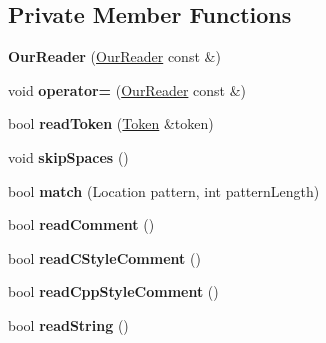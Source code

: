 \subsection*{Private Member Functions}
\begin{DoxyCompactItemize}
\item 
\hypertarget{class_json_1_1_our_reader_aee013005522c0d34d2e14962851487ac}{}{\bfseries Our\+Reader} (\hyperlink{class_json_1_1_our_reader}{Our\+Reader} const \&)\label{class_json_1_1_our_reader_aee013005522c0d34d2e14962851487ac}

\item 
\hypertarget{class_json_1_1_our_reader_ad418de7c47bd3d0510888e22110b796e}{}void {\bfseries operator=} (\hyperlink{class_json_1_1_our_reader}{Our\+Reader} const \&)\label{class_json_1_1_our_reader_ad418de7c47bd3d0510888e22110b796e}

\item 
\hypertarget{class_json_1_1_our_reader_a0d1e66da47fe2e85f5033c59326dfdc3}{}bool {\bfseries read\+Token} (\hyperlink{class_json_1_1_our_reader_1_1_token}{Token} \&token)\label{class_json_1_1_our_reader_a0d1e66da47fe2e85f5033c59326dfdc3}

\item 
\hypertarget{class_json_1_1_our_reader_a6fbc6d58a4505e5ccadf330b57b17ca5}{}void {\bfseries skip\+Spaces} ()\label{class_json_1_1_our_reader_a6fbc6d58a4505e5ccadf330b57b17ca5}

\item 
\hypertarget{class_json_1_1_our_reader_a4a03f1b266def9b47c4fef35386557fb}{}bool {\bfseries match} (Location pattern, int pattern\+Length)\label{class_json_1_1_our_reader_a4a03f1b266def9b47c4fef35386557fb}

\item 
\hypertarget{class_json_1_1_our_reader_a90f6bb9e55b2bc3d6c1880809495c222}{}bool {\bfseries read\+Comment} ()\label{class_json_1_1_our_reader_a90f6bb9e55b2bc3d6c1880809495c222}

\item 
\hypertarget{class_json_1_1_our_reader_aba784b125baa1b62387e767b791f2f89}{}bool {\bfseries read\+C\+Style\+Comment} ()\label{class_json_1_1_our_reader_aba784b125baa1b62387e767b791f2f89}

\item 
\hypertarget{class_json_1_1_our_reader_ae3de80671f0f997053e1c1c8a47a45c5}{}bool {\bfseries read\+Cpp\+Style\+Comment} ()\label{class_json_1_1_our_reader_ae3de80671f0f997053e1c1c8a47a45c5}

\item 
\hypertarget{class_json_1_1_our_reader_a5d39b12671499ec5975f3bbc84b7d438}{}bool {\bfseries read\+String} ()\label{class_json_1_1_our_reader_a5d39b12671499ec5975f3bbc84b7d438}


\end{DoxyCompactItemize}
